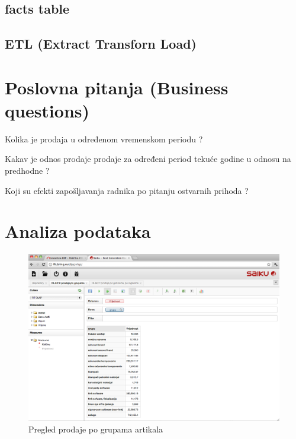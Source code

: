 \documentclass[times, utf8, seminar]{fit}
\begin{document}
\subsection{facts table}



\subsection{ETL (Extract Transforn Load)}




\section{Poslovna pitanja (Business questions)}

Kolika je prodaja u određenom vremenskom periodu ?

Kakav je odnos prodaje prodaje za određeni period tekuće godine u odnosu na predhodne ?

Koji su efekti zapošljavanja radnika po pitanju ostvarnih prihoda ?


\section{Analiza podataka}



\begin{figure}[H]
\centering
\includegraphics[width=15cm]{img/saiku_rpt_grupe}
\caption{Pregled prodaje po grupama artikala}
\end{figure}
\end{document}
